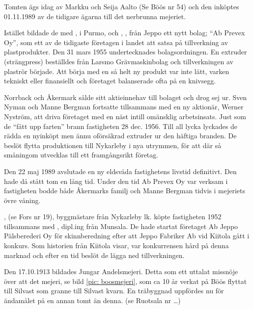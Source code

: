 Tomten ägs idag av Markku och Seija Aalto (Se Böös nr 54) och den inköptes 01.11.1989 av de tidigare ägarna till det nerbrunna mejeriet.



Istället bildade de med ,  i Purmo, och , , från Jeppo ett nytt bolag; ``Ab Prevex Oy'', som ett av de tidigaste företagen i landet att satsa på tillverkning av plastprodukter. Den 31 mars 1955 undertecknades bolagsordningen. En extruder (strängpress) beställdes från Larsmo Grävmaskinbolag och  tillverkningen av plaströr började. Att börja med en så helt ny produkt var inte lätt, varken tekniskt eller finansiellt och företaget balanserade ofta på en knivsegg.

Norrback och Åkermark sålde sitt aktieinnehav till bolaget och drog sej ur. Sven Nyman och Manne Bergman fortsatte tillsammans med en ny aktionär, Werner Nyström, att  driva företaget med en näst intill omänsklig arbetsinsats. Just som de ``fått upp farten'' brann fastigheten 28 dec. 1956. Till all lycka lyckades de rädda en nyinköpt men ännu oförsäkrad extruder ur den häftiga branden. De beslöt flytta produktionen till Nykarleby i nya utrymmen, för att där så småningom utvecklas till ett framgångsrikt företag.

Den 22 maj 1989 avslutade en ny eldsvåda fastighetens livstid definitivt. Den hade då stått tom en lång tid. Under den tid Ab Prevex Oy var verksam i fastigheten bodde både Åkermarks familj och Manne Bergman tidvis i mejeriets övre våning.


,  (se Fors nr 19), byggmästare från Nykarleby lk. köpte fastigheten 1952 tillsammans med , dipl.ing från Munsala. De hade startat företaget Ab Jeppo Pälsberederi Oy för skinnberedning efter att Jeppo Fabriker Ab vid Kiitola gått i konkurs. Som historien från Kiitola visar, var konkurrensen hård på denna marknad och efter en tid beslöt de lägga ned tillverkningen.




Den 17.10.1913 bildades Jungar Andelsmejeri. Detta som ett uttalat missnöje över att det mejeri, se bild \ref{pic: boosmejeri}, som ca 10 år verkat på Böös flyttat till Silvast som granne till Silvast kvarn. En träbyggnad uppfördes nu för ändamålet på en annan tomt än denna. (se Ruotsala nr …)

